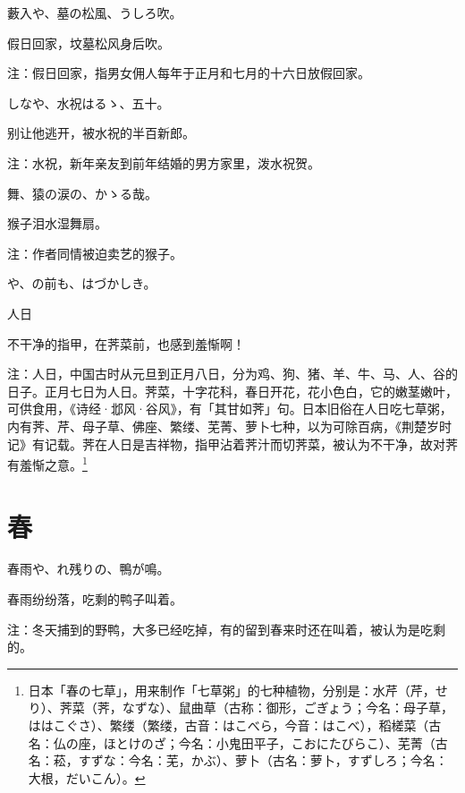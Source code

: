 \begin{haiku}
    {\FH 藪入や、墓の松風、うしろ吹。}

    {\FK 假日回家，坟墓松风身后吹。}

    {\FT 注：假日回家，指男女佣人每年于正月和七月的十六日放假回家。}
\end{haiku}

\begin{haiku}
    {\FH {}しなや、水祝はるゝ、五十。}

    {\FK 别让他逃开，被水祝的半百新郎。}

    {\FT 注：水祝，新年亲友到前年结婚的男方家里，泼水祝贺。}
\end{haiku}

\begin{haiku}
    {\FH 舞、猿の涙の、かゝる哉。}

    {\FK 猴子泪水湿舞扇。}

    {\FT 注：作者同情被迫卖艺的猴子。}
\end{haiku}

\begin{haiku}
    {\FH {}や、の前も、はづかしき。}

    {\FK 人日}

    {\FK 不干净的指甲，在荠菜前，也感到羞惭啊！}

    {\FT 注：人日，中国古时从元旦到正月八日，分为鸡、狗、猪、羊、牛、马、人、谷的日子。正月七日为人日。荠菜，十字花科，春日开花，花小色白，它的嫩茎嫩叶，可供食用，《诗经·邶风·谷风》，有「其甘如荠」句。日本旧俗在人日吃七草粥，内有荠、芹、母子草、佛座、繁缕、芜菁、萝卜七种，以为可除百病，《荆楚岁时记》有记载。荠在人日是吉祥物，指甲沾着荠汁而切荠菜，被认为不干净，故对荠有羞惭之意。\footnote{\FT 日本「春の七草」，用来制作「七草粥」的七种植物，分别是：水芹（芹，せり）、荠菜（荠，なずな）、鼠曲草（古称：御形，ごぎょう；今名：母子草，ははこぐさ）、繁缕（繁缕，古音：はこべら，今音：はこべ），稻槎菜（古名：仏の座，ほとけのざ；今名：小鬼田平子，こおにたびらこ）、芜菁（古名：菘，すずな：今名：芜，かぶ）、萝卜（古名：萝卜，すずしろ；今名：大根，だいこん）。}}
\end{haiku}

\section{\FK 春}

\setcounter{haikucounter}{0}

\begin{haiku}
    {\FH 春雨や、れ残りの、鴨が鳴。}

    {\FK 春雨纷纷落，吃剩的鸭子叫着。}

    {\FT 注：冬天捕到的野鸭，大多已经吃掉，有的留到春来时还在叫着，被认为是吃剩的。}
\end{haiku}

